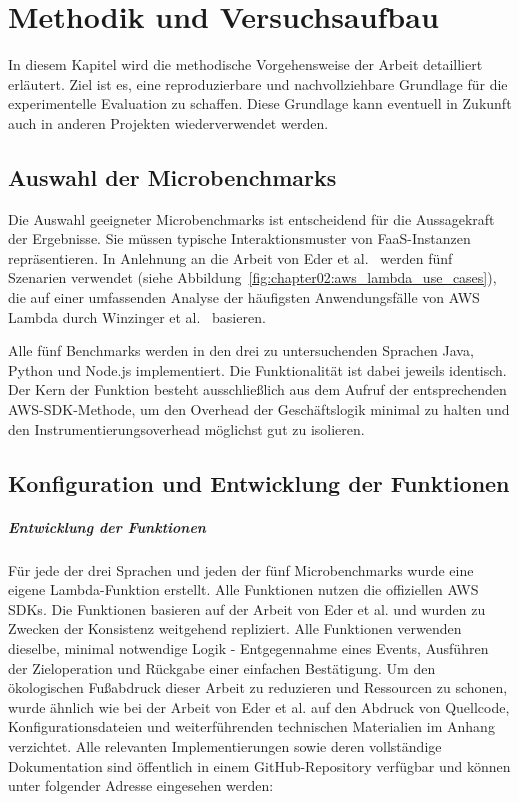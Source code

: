 \chapter{Methodik und Versuchsaufbau}
\label{ch:chapter04}

In diesem Kapitel wird die methodische Vorgehensweise der Arbeit detailliert erläutert. 
Ziel ist es, eine reproduzierbare und nachvollziehbare Grundlage für die experimentelle Evaluation zu schaffen. 
Diese Grundlage kann eventuell in Zukunft auch in anderen Projekten wiederverwendet werden.

\section{Auswahl der Microbenchmarks} 
\label{sec:auswahl-microbenchmarks}

Die Auswahl geeigneter Microbenchmarks ist entscheidend für die Aussagekraft der Ergebnisse. 
Sie müssen typische Interaktionsmuster von \ac{FaaS}-Instanzen repräsentieren. 
In Anlehnung an die Arbeit von Eder et al.~\cite{10254754} werden fünf Szenarien verwendet (siehe Abbildung~\ref{fig:chapter02:aws_lambda_use_cases}), 
die auf einer umfassenden Analyse der häufigsten Anwendungsfälle von AWS Lambda durch Winzinger et al.~\cite{Winzinger2021DataFlow} 
basieren.


Alle fünf Benchmarks werden in den drei zu untersuchenden Sprachen Java, Python und Node.js implementiert. 
Die Funktionalität ist dabei jeweils identisch. Der Kern der Funktion besteht ausschließlich aus dem Aufruf der 
entsprechenden AWS-SDK-Methode, um den Overhead der Geschäftslogik minimal zu halten und den Instrumentierungsoverhead 
möglichst gut zu isolieren.

\section{Konfiguration und Entwicklung der Funktionen}
\label{sec:entwicklung-funktionen}
\paragraph{Entwicklung der Funktionen}
Für jede der drei Sprachen und jeden der fünf Microbenchmarks wurde eine eigene Lambda-Funktion erstellt. 
Alle Funktionen nutzen die offiziellen AWS SDKs. 
Die Funktionen basieren auf der Arbeit von Eder et al. \cite{10254754} und wurden zu Zwecken der Konsistenz weitgehend repliziert. 
Alle Funktionen verwenden dieselbe, minimal notwendige Logik - Entgegennahme eines Events, Ausführen der Zieloperation und Rückgabe einer 
einfachen Bestätigung. 
Um den ökologischen Fußabdruck dieser Arbeit zu reduzieren und Ressourcen zu schonen, wurde ähnlich wie bei der Arbeit von Eder et al. \cite{10254754} 
auf den Abdruck von Quellcode, Konfigurationsdateien und weiterführenden technischen Materialien im Anhang verzichtet. 
Alle relevanten Implementierungen sowie deren vollständige Dokumentation sind öffentlich in einem GitHub-Repository verfügbar und 
können unter folgender Adresse eingesehen werden: 


